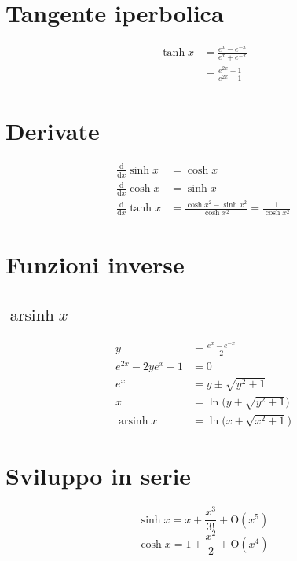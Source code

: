 \documentclass[10pt,a4paper]{article}
\begin{document}
\section{Tangente iperbolica}

\begin{align*}
  \tanh{x} &= \frac{e^x - e^{-x}}{e^x + e^{-x}} \\
  &= \frac{e^{2x}-1}{e^{2x}+1}
\end{align*}

\section{Derivate}

\begin{align*}
  \frac{\mathrm d}{\mathrm d x}\sinh{x} &= \cosh{x} \\
  \frac{\mathrm d}{\mathrm d x}\cosh{x} &= \sinh{x} \\
  \frac{\mathrm d}{\mathrm d x}\tanh{x} &= \frac{\cosh{x}^2-\sinh{x}^2}{\cosh{x}^2}= \frac{1}{\cosh{x}^2}
\end{align*}

\section{Funzioni inverse}

\subsection{$\operatorname{arsinh}{x}$}
\begin{align*}
 y &= \frac{e^x-e^{-x}}{2} \\
e^{2x} -2y e^x -1 &=0 \\
e^x &= y \pm \sqrt{y^2+1} \\
x &= \ln{\big(y + \sqrt{y^2+1}\big)} \\
\operatorname{arsinh}{x} &= \ln{\big(x +  \sqrt{x^2 + 1}\big)}
\end{align*}

\section{Sviluppo in serie}

\begin{equation}
  \label{eq:taylor_sinhx}
  \sinh{x} = x + \frac{x^3}{3!} + \mathrm{O}(x^5)
\end{equation}
\begin{equation}
  \label{eq:taylor_coshx}
  \cosh{x} = 1 + \frac{x^2}{2} + \mathrm{O}(x^4)
\end{equation}
\end{document}
